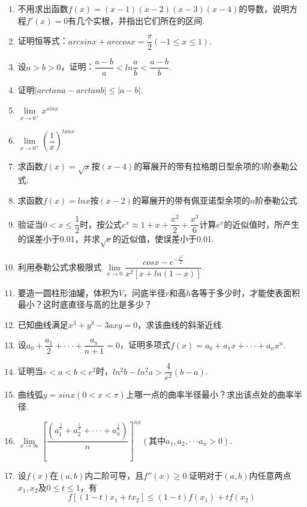 \documentclass[UTF8]{ctexart}
\begin{document}
\begin{enumerate}[(1)]
\item 不用求出函数$f(x)=(x-1)(x-2)(x-3)(x-4)$的导数，说明方程$f'(x)=0$有几个实根，并指出它们所在的区间.
\item 证明恒等式：$arcsinx+arccosx=\dfrac{\pi}{2}(-1\leq x \leq 1).$
\vspace{-2mm}\item 设$a>b>0$，证明：$\dfrac{a-b}{a}<ln\dfrac{a}{b}<\dfrac{a-b}{b}.$
\item 证明$|arctan a-arctan b|\leq |a-b|.$
\item $\lim\limits_{x \to 0^+} x^{sinx} $
\item $\lim\limits_{x \to 0^+} (\dfrac{1}{x})^{tanx}$
\item 求函数$f(x)=\sqrt{x}$按$(x-4)$的幂展开的带有拉格朗日型余项的3阶泰勒公式.
\item 求函数$f(x)=lnx$按$(x-2)$的幂展开的带有佩亚诺型余项的$n$阶泰勒公式.
\item 验证当$0<x\leq \dfrac{1}{2}$时，按公式$e^x\approx 1+x+\dfrac{x^2}{2}+\dfrac{x^3}{6}$计算$e^x$的近似值时，所产生的误差小于0.01，并求$\sqrt{e}$的近似值，使误差小于0.01.
\item 利用泰勒公式求极限式 $\lim\limits_{x \to 0} \dfrac{cosx-e^{-\frac{x^2}{2}}}{x^2[x+ln(1-x)]}.$
\item 要造一圆柱形油罐，体积为$V$，问底半径$r$和高$h$各等于多少时，才能使表面积最小？这时底直径与高的比是多少？
\item 已知曲线满足$x^3+y^3-3axy=0$，求该曲线的斜渐近线.
\item 设$a_0+\dfrac{a_1}{2}+\cdot \cdot \cdot+\dfrac{a_n}{n+1}=0$，证明多项式$f(x)=a_0+a_1x+\cdot\cdot\cdot+a_nx^n.$
\item 证明当$e<a<b<e^2$时，$ln^2b-ln^2a>\dfrac{4}{e^2}(b-a)$.
\item 曲线弧$y=sinx(0<x<\pi)$上哪一点的曲率半径最小？求出该点处的曲率半径.
\item $\lim\limits_{x \to \infty} [\dfrac{(a_1^{\frac{1}{x}}+a_2^{\frac{1}{x}}+\cdot\cdot\cdot+a_n^{\frac{1}{x}})}{n}]^{nx}(\mbox{其中}a_1,a_2,\cdot\cdot\cdot a_n>0).$
\item 设$f(x)$在$(a,b)$内二阶可导，且$f''(x)\geq 0. $证明对于$(a,b)$内任意两点$x_1,x_2$及$0\leq t\leq1$，有
$$f[(1-t)x_1+tx_2]\leq(1-t)f(x_1)+tf(x_2)$$
\end{enumerate}
\end{document}
